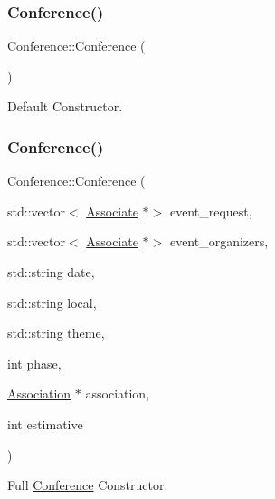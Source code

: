 \subsubsection{\texorpdfstring{Conference()}{Conference()}\hspace{0.1cm}{\footnotesize\ttfamily [1/3]}}
{\footnotesize\ttfamily Conference\+::\+Conference (\begin{DoxyParamCaption}{ }\end{DoxyParamCaption})}



Default Constructor. 

\mbox{\label{classConference_a128ae6e184a018975429e6dda331c865}} 
\subsubsection{\texorpdfstring{Conference()}{Conference()}\hspace{0.1cm}{\footnotesize\ttfamily [2/3]}}
{\footnotesize\ttfamily Conference\+::\+Conference (\begin{DoxyParamCaption}\item[{std\+::vector$<$ \mbox{\hyperlink{classAssociate}{Associate}} $\ast$$>$}]{event\+\_\+request,  }\item[{std\+::vector$<$ \mbox{\hyperlink{classAssociate}{Associate}} $\ast$$>$}]{event\+\_\+organizers,  }\item[{std\+::string}]{date,  }\item[{std\+::string}]{local,  }\item[{std\+::string}]{theme,  }\item[{int}]{phase,  }\item[{\mbox{\hyperlink{classAssociation}{Association}} $\ast$}]{association,  }\item[{int}]{estimative }\end{DoxyParamCaption})}



Full \mbox{\hyperlink{classConference}{Conference}} Constructor. 


